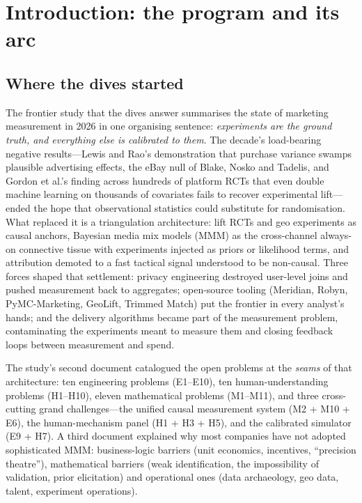 \chapter*{Introduction: the program and its arc}

\section*{Where the dives started}

The frontier study that the dives answer summarises the state of marketing measurement in 2026 in one
organising sentence: \emph{experiments are the ground truth, and everything else is calibrated to them}.
The decade's load-bearing negative results---Lewis and Rao's demonstration that purchase variance swamps
plausible advertising effects, the eBay null of Blake, Nosko and Tadelis, and Gordon et al.'s finding across
hundreds of platform RCTs that even double machine learning on thousands of covariates fails to recover
experimental lift---ended the hope that observational statistics could substitute for randomisation. What
replaced it is a triangulation architecture: lift RCTs and geo experiments as causal anchors, Bayesian media
mix models (MMM) as the cross-channel always-on connective tissue with experiments injected as priors or
likelihood terms, and attribution demoted to a fast tactical signal understood to be non-causal. Three forces
shaped that settlement: privacy engineering destroyed user-level joins and pushed measurement back to
aggregates; open-source tooling (Meridian, Robyn, PyMC-Marketing, GeoLift, Trimmed Match) put the frontier in
every analyst's hands; and the delivery algorithms became part of the measurement problem, contaminating the
experiments meant to measure them and closing feedback loops between measurement and spend.

The study's second document catalogued the open problems at the \emph{seams} of that architecture: ten
engineering problems (E1--E10), ten human-understanding problems (H1--H10), eleven mathematical problems
(M1--M11), and three cross-cutting grand challenges---the unified causal measurement system (M2 + M10 + E6),
the human-mechanism panel (H1 + H3 + H5), and the calibrated simulator (E9 + H7). A third document explained
why most companies have not adopted sophisticated MMM: business-logic barriers (unit economics, incentives,
``precision theatre''), mathematical barriers (weak identification, the impossibility of validation, prior
elicitation) and operational ones (data archaeology, geo data, talent, experiment operations).

